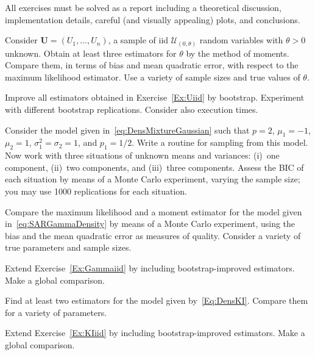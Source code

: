 All exercises must be solved as a report including a theoretical discussion, implementation details, careful (and visually appealing) plots, and conclusions.

\begin{exer}\label{Ex:Uiid}
Consider $\bm U=(U_1,\dots,U_n)$, a sample of iid $\mathcal U_{(0,\theta)}$ random variables with $\theta>0$ unknown.
Obtain at least three estimators for $\theta$ by the method of moments.
Compare them, in terms of bias and mean quadratic error, with respect to the maximum likelihood estimator.
Use a variety of sample sizes and true values of $\theta$.
\end{exer}

\begin{exer}
Improve all estimators obtained in Exercise~\ref{Ex:Uiid} by bootstrap.
Experiment with different bootstrap replications.
Consider also execution times.
\end{exer}

\begin{exer}
Consider the model given in~\eqref{eq:DensMixtureGaussian} such that $p=2$, $\mu_1=-1$, $\mu_2=1$, $\sigma_1^2=\sigma_2=1$, and $p_1=1/2$.
Write a routine for sampling from this model.
Now work with three situations of unknown means and variances:
(i)~one component, (ii)~two components, and (iii)~three components.
Assess the BIC of each situation by means of a Monte Carlo experiment, varying the sample size; you may use \num{1000} replications for each situation.
\end{exer}

\begin{exer}\label{Ex:Gammaiid}
Compare the maximum likelihood and a moment estimator for the model given in~\eqref{eq:SARGammaDensity} by means of a Monte Carlo experiment, using the bias and the mean quadratic error as measures of quality.
Consider a variety of true parameters and sample sizes.
\end{exer}

\begin{exer}
Extend Exercise~\ref{Ex:Gammaiid} by including bootstrap-improved estimators.
Make a global comparison.
\end{exer}

\begin{exer}\label{Ex:KIiid}
Find at least two estimators for the model given by~\eqref{Eq:DensKI}.
Compare them for a variety of parameters.
\end{exer}

\begin{exer}
Extend Exercise~\ref{Ex:KIiid} by including bootstrap-improved estimators.
Make a global comparison.
\end{exer}
